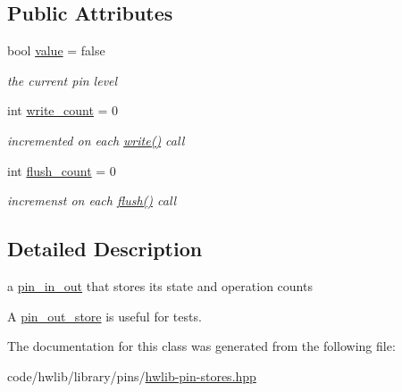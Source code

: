 \subsection*{Public Attributes}
\begin{DoxyCompactItemize}
\item 
\mbox{\label{classhwlib_1_1pin__out__store_a11131771c401a83c82b19e7be07ac990}} 
bool \hyperlink{classhwlib_1_1pin__out__store_a11131771c401a83c82b19e7be07ac990}{value} = false
\begin{DoxyCompactList}\small\item\em the current pin level \end{DoxyCompactList}\item 
\mbox{\label{classhwlib_1_1pin__out__store_a0b03216560cf06272d72f2669a68ccab}} 
int \hyperlink{classhwlib_1_1pin__out__store_a0b03216560cf06272d72f2669a68ccab}{write\+\_\+count} = 0
\begin{DoxyCompactList}\small\item\em incremented on each \hyperlink{classhwlib_1_1pin__out__store_a9ac425ba85709b5c1095e90a94445c77}{write()} call \end{DoxyCompactList}\item 
\mbox{\label{classhwlib_1_1pin__out__store_a848f604135b3e459269572f4c3aa2926}} 
int \hyperlink{classhwlib_1_1pin__out__store_a848f604135b3e459269572f4c3aa2926}{flush\+\_\+count} = 0
\begin{DoxyCompactList}\small\item\em incremenst on each \hyperlink{classhwlib_1_1pin__out__store_a795292c741832d0cedb63b9333ef224f}{flush()} call \end{DoxyCompactList}\end{DoxyCompactItemize}


\subsection{Detailed Description}
a \hyperlink{classhwlib_1_1pin__in__out}{pin\+\_\+in\+\_\+out} that stores its state and operation counts

A \hyperlink{classhwlib_1_1pin__out__store}{pin\+\_\+out\+\_\+store} is useful for tests. 

The documentation for this class was generated from the following file\+:\begin{DoxyCompactItemize}
\item 
code/hwlib/library/pins/\hyperlink{hwlib-pin-stores_8hpp}{hwlib-\/pin-\/stores.\+hpp}\end{DoxyCompactItemize}
